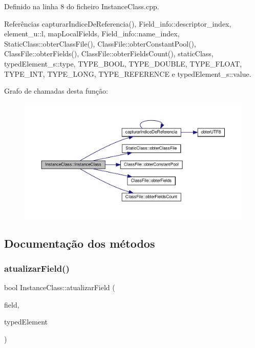 Definido na linha 8 do ficheiro Instance\+Class.\+cpp.



Referências capturar\+Indice\+De\+Referencia(), Field\+\_\+info\+::descriptor\+\_\+index, element\+\_\+u\+::l, map\+Local\+Fields, Field\+\_\+info\+::name\+\_\+index, Static\+Class\+::obter\+Class\+File(), Class\+File\+::obter\+Constant\+Pool(), Class\+File\+::obter\+Fields(), Class\+File\+::obter\+Fields\+Count(), static\+Class, typed\+Element\+\_\+s\+::type, T\+Y\+P\+E\+\_\+\+B\+O\+OL, T\+Y\+P\+E\+\_\+\+D\+O\+U\+B\+LE, T\+Y\+P\+E\+\_\+\+F\+L\+O\+AT, T\+Y\+P\+E\+\_\+\+I\+NT, T\+Y\+P\+E\+\_\+\+L\+O\+NG, T\+Y\+P\+E\+\_\+\+R\+E\+F\+E\+R\+E\+N\+CE e typed\+Element\+\_\+s\+::value.

Grafo de chamadas desta função\+:\nopagebreak
\begin{figure}[H]
\begin{center}
\leavevmode
\includegraphics[width=350pt]{classInstanceClass_ac1bee1eb9725e1fec8de7f4cf97f369c_cgraph}
\end{center}
\end{figure}


\subsection{Documentação dos métodos}
\mbox{\label{classInstanceClass_a3af2fc7bfe8f406b5ea6efbf18161514}} 
\subsubsection{\texorpdfstring{atualizar\+Field()}{atualizarField()}}
{\footnotesize\ttfamily bool Instance\+Class\+::atualizar\+Field (\begin{DoxyParamCaption}\item[{string}]{field,  }\item[{\hyperlink{BasicTypes_8h_a97b332303b1262282599e6ede0637b82}{Typed\+Element}}]{typed\+Element }\end{DoxyParamCaption})}



